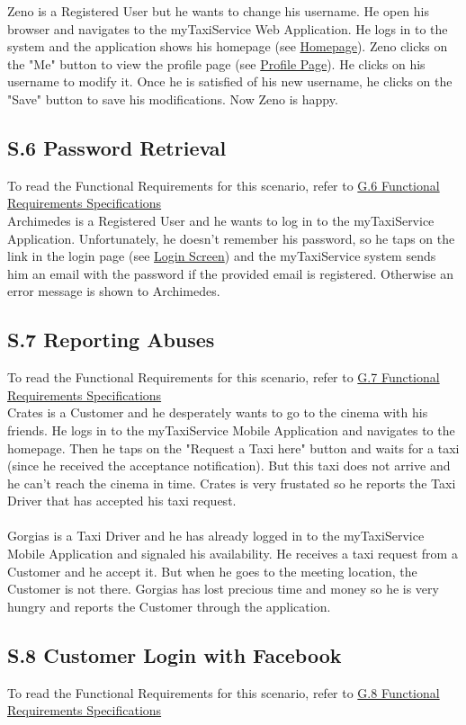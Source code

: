 		Zeno is a Registered User but he wants to change his username. He open his browser and navigates to the myTaxiService Web Application. He logs in to the system and the application shows his homepage (see \hyperref[chome_m]{Homepage}). Zeno clicks on the "Me" button to view the profile page (see \hyperref[cpersonalPage_m]{Profile Page}). He clicks on his username to modify it. Once he is satisfied of his new username, he clicks on the "Save" button to save his modifications. Now Zeno is happy.

		\subsection{S.6 Password Retrieval}\label{sec:PasswordRetrievalScenario}
		To read the Functional Requirements for this scenario, refer to \hyperref[sec:frs6]{G.6 Functional Requirements Specifications}\\

		Archimedes is a Registered User and he wants to log in to the myTaxiService Application. Unfortunately, he doesn't remember his password, so he taps on the link in the login page (see \hyperref[login_m]{Login Screen}) and the myTaxiService system sends him an email with the password if the provided email is registered. Otherwise an error message is shown to Archimedes.

		\subsection{S.7 Reporting Abuses}\label{sec:ReportingAbusesScenario}
		To read the Functional Requirements for this scenario, refer to \hyperref[sec:frs7]{G.7 Functional Requirements Specifications}\\

		\label{sec:TaxiDriverReportingScenario}
		Crates is a Customer and he desperately wants to go to the cinema with his friends. He logs in to the myTaxiService Mobile Application and navigates to the homepage. Then he taps on the "Request a Taxi here" button and waits for a taxi (since he received the acceptance notification). But this taxi does not arrive and he can't reach the cinema in time. Crates is very frustated so he reports the Taxi Driver that has accepted his taxi request.
		\\
		\\
		\label{sec:CustomerReportingScenario}
		Gorgias is a Taxi Driver and he has already logged in to the myTaxiService Mobile Application and signaled his availability. He receives a taxi request from a Customer and he accept it. But when he goes to the meeting location, the Customer is not there. Gorgias has lost precious time and money so he is very hungry and reports the Customer through the application. 

		\subsection{S.8 Customer Login with Facebook}
		To read the Functional Requirements for this scenario, refer to \hyperref[sec:frs8]{G.8 Functional Requirements Specifications}\\

		\label{sec:CustomerFacebookLoginScenario}
		